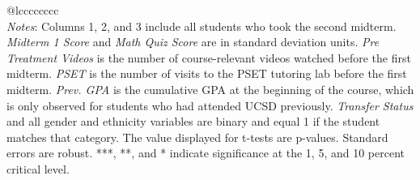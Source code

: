 \begin{tabular}{@{\extracolsep{5pt}}lcccccccc}
\hline \hline \\[-1.8ex]
{\textit{Notes}: Columns 1, 2, and 3 include all students who took the second midterm.  \textit{Midterm 1 Score} and \textit{Math Quiz Score} are in standard  deviation units. \textit{Pre Treatment Videos} is the number of course-relevant  videos watched before the first midterm. \textit{PSET} is the number of visits  to the PSET tutoring lab before the first midterm. \textit{Prev. GPA} is the cumulative  GPA at the beginning of the course, which is only observed for students who had attended  UCSD previously. \textit{Transfer Status} and all gender and ethnicity variables  are binary and equal 1 if the student matches that category.  The value displayed for t-tests are p-values. Standard errors are robust. ***, **, and * indicate significance at the 1, 5, and 10 percent critical level. }
\end{tabular}
